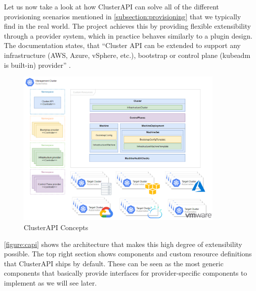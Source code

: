     Let us now take a look at how ClusterAPI can solve all of the different provisioning scenarios mentioned in \autoref{subsection:provisioning} that we typically find in the real world. The project achieves this by providing flexible extensibility through a provider system, which in practice behaves similarly to a plugin design. The documentation states, that ``Cluster API can be extended to support any infrastructure (AWS, Azure, vSphere, etc.), bootstrap or control plane (kubeadm is built-in) provider'' \cite{capi_github}.

    \begin{figure}[htbp]
        \centering
        \includegraphics[width=0.9\textwidth]{img/capi.png}
        \caption{ClusterAPI Concepts \cite{the_cluster_api_book}}
        \label{figure:capi}
    \end{figure}

    \noindent \autoref{figure:capi} shows the architecture that makes this high degree of extensibility possible. The top right section shows components and custom resource definitions that ClusterAPI ships by default. These can be seen as the most generic components that basically provide interfaces for provider-specific components to implement as we will see later. 
    
